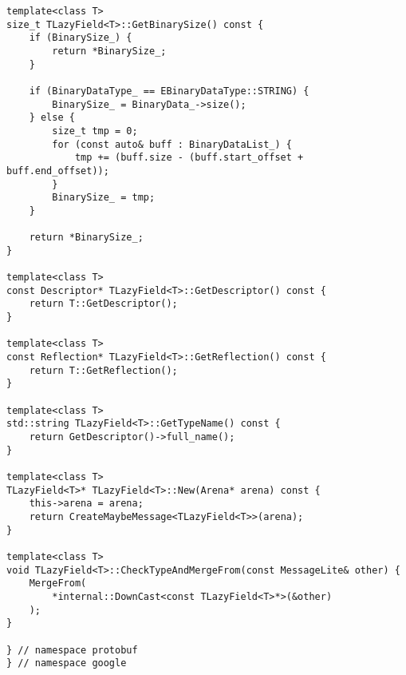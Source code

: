 \begin{lstlisting}[style=CodeListing]
template<class T>
size_t TLazyField<T>::GetBinarySize() const {
    if (BinarySize_) {
        return *BinarySize_;
    }

    if (BinaryDataType_ == EBinaryDataType::STRING) {
        BinarySize_ = BinaryData_->size();
    } else {
        size_t tmp = 0;
        for (const auto& buff : BinaryDataList_) {
            tmp += (buff.size - (buff.start_offset + buff.end_offset));
        }
        BinarySize_ = tmp;
    }

    return *BinarySize_;
}

template<class T>
const Descriptor* TLazyField<T>::GetDescriptor() const {
    return T::GetDescriptor();
}

template<class T>
const Reflection* TLazyField<T>::GetReflection() const {
    return T::GetReflection();
}

template<class T>
std::string TLazyField<T>::GetTypeName() const {
    return GetDescriptor()->full_name();
}

template<class T>
TLazyField<T>* TLazyField<T>::New(Arena* arena) const {
    this->arena = arena;
    return CreateMaybeMessage<TLazyField<T>>(arena);
}

template<class T>
void TLazyField<T>::CheckTypeAndMergeFrom(const MessageLite& other) {
    MergeFrom(
        *internal::DownCast<const TLazyField<T>*>(&other)
    );
}

} // namespace protobuf
} // namespace google
\end{lstlisting}
\normalsize
